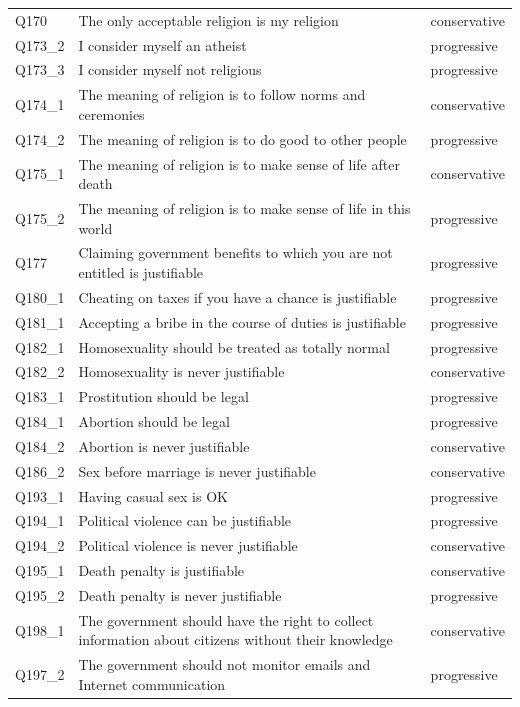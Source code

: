 \documentclass[]{ceurart}
\begin{document}
\begin{longtable}{@{\extracolsep{\fill}}l>{\raggedright\arraybackslash}p{}l}
Q170 & The only acceptable religion is my religion & conservative \\ 
Q173\_2 & I consider myself an atheist & progressive \\ 
Q173\_3 & I consider myself not religious & progressive \\ 
Q174\_1 & The meaning of religion is to follow norms and ceremonies & conservative \\ 
Q174\_2 & The meaning of religion is to do good to other people & progressive \\ 
Q175\_1 & The meaning of religion is to make sense of life after death & conservative \\ 
Q175\_2 & The meaning of religion is to make sense of life in this world & progressive \\ 
Q177 & Claiming government benefits to which you are not entitled is justifiable & progressive \\ 
Q180\_1 & Cheating on taxes if you have a chance is justifiable & progressive \\ 
Q181\_1 & Accepting a bribe in the course of duties is justifiable & progressive \\ 
Q182\_1 & Homosexuality should be treated as totally normal & progressive \\ 
Q182\_2 & Homosexuality is never justifiable & conservative \\ 
Q183\_1 & Prostitution should be legal & progressive \\ 
Q184\_1 & Abortion should be legal & progressive \\ 
Q184\_2 & Abortion is never justifiable & conservative \\ 
Q186\_2 & Sex before marriage is never justifiable & conservative \\ 
Q193\_1 & Having casual sex is OK & progressive \\ 
Q194\_1 & Political violence can be justifiable & progressive \\ 
Q194\_2 & Political violence is never justifiable & conservative \\ 
Q195\_1 & Death penalty is justifiable & conservative \\ 
Q195\_2 & Death penalty is never justifiable & progressive \\ 
Q198\_1 & The government should have the right to collect information about citizens without their knowledge & conservative \\ 
Q197\_2 & The government should not monitor emails and Internet communication & progressive \\ 

\end{longtable}
\end{document}
